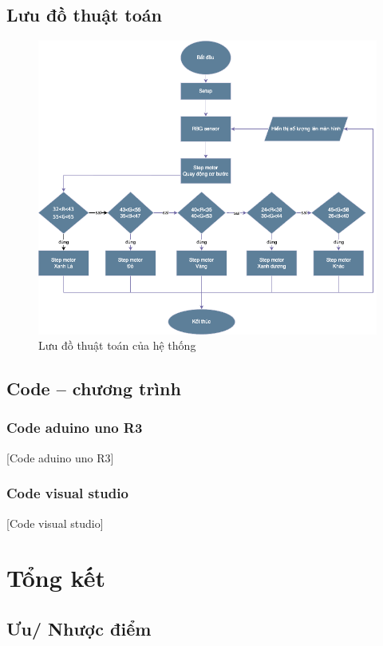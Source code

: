 \documentclass[12pt]{report}
\begin{document}
\section{Lưu đồ thuật toán}
    \begin{figure}[H]
        \centering
        \includegraphics[width=1\linewidth]{image/Luudothuattoan.png}
        \caption{Lưu đồ thuật toán của hệ thống}
    \end{figure}
\section{Code – chương trình}
\subsection*{Code aduino uno R3}
    \href{https://github.com/ngoxuanphong/arduino_color_sorting/blob/main/src/Color_Sorting_Arduino.ino}[Code aduino uno R3]
\subsection*{Code visual studio}
    \href{https://github.com/ngoxuanphong/arduino_color_sorting/blob/main/src/MyForm.h}[Code visual studio]

\chapter{Tổng kết}
\section{Ưu/ Nhược điểm}
\end{document}
